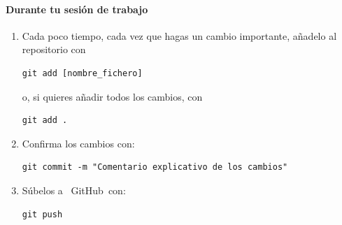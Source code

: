 \documentclass[11pt,a4paper]{article}
\newcommand{\GitHub}{\faIcon{github}~\!GitHub}
\theoremstyle{exercise}
\begin{document}
\paragraph{Durante tu sesión de trabajo}

\begin{enumerate}
\item Cada poco tiempo, cada vez que hagas un cambio importante, añadelo al repositorio con
\begin{lstlisting}[style=ubuntugnome]
git add [nombre_fichero]
\end{lstlisting}
o, si quieres añadir todos los cambios, con
\begin{lstlisting}[style=ubuntugnome]
git add .
\end{lstlisting}

	
\item Confirma los cambios con:
\begin{lstlisting}[style=ubuntugnome]
git commit -m "Comentario explicativo de los cambios"
\end{lstlisting}
	
\item Súbelos a \GitHub\ con:
	
\begin{lstlisting}[style=ubuntugnome]
git push
\end{lstlisting}
\end{enumerate}
\end{document}

